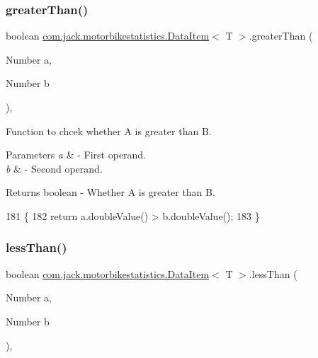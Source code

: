 \subsubsection{\texorpdfstring{greater\+Than()}{greaterThan()}}
{\footnotesize\ttfamily boolean \hyperlink{classcom_1_1jack_1_1motorbikestatistics_1_1_data_item}{com.\+jack.\+motorbikestatistics.\+Data\+Item}$<$ T $>$.greater\+Than (\begin{DoxyParamCaption}\item[{Number}]{a,  }\item[{Number}]{b }\end{DoxyParamCaption})\hspace{0.3cm}{\ttfamily [inline]}, {\ttfamily [private]}}



Function to chcek whether A is greater than B. 


\begin{DoxyParams}{Parameters}
{\em a} & -\/ First operand. \\
\hline
{\em b} & -\/ Second operand. \\
\hline
\end{DoxyParams}
\begin{DoxyReturn}{Returns}
boolean -\/ Whether A is greater than B. 
\end{DoxyReturn}

\begin{DoxyCode}
181                                                     \{
182         \textcolor{keywordflow}{return} a.doubleValue() > b.doubleValue();
183     \}
\end{DoxyCode}
\mbox{\label{classcom_1_1jack_1_1motorbikestatistics_1_1_data_item_af8d81a7e3c07f7c3a02035c872159388}} 
\subsubsection{\texorpdfstring{less\+Than()}{lessThan()}}
{\footnotesize\ttfamily boolean \hyperlink{classcom_1_1jack_1_1motorbikestatistics_1_1_data_item}{com.\+jack.\+motorbikestatistics.\+Data\+Item}$<$ T $>$.less\+Than (\begin{DoxyParamCaption}\item[{Number}]{a,  }\item[{Number}]{b }\end{DoxyParamCaption})\hspace{0.3cm}{\ttfamily [inline]}, {\ttfamily [private]}}



